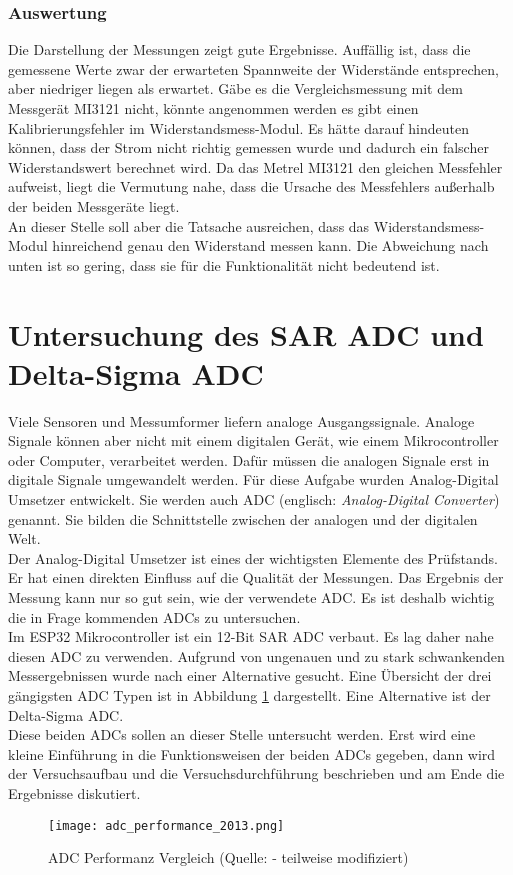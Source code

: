 \subsubsection{Auswertung}
Die Darstellung der Messungen zeigt gute Ergebnisse. Auffällig ist, dass die gemessene Werte zwar der erwarteten Spannweite der Widerstände entsprechen, aber niedriger liegen als erwartet. Gäbe es die Vergleichsmessung mit dem Messgerät MI3121 nicht, könnte angenommen werden es gibt einen Kalibrierungsfehler im Widerstandsmess-Modul. Es hätte darauf hindeuten können, dass der Strom nicht richtig gemessen wurde und dadurch ein falscher Widerstandswert berechnet wird. Da das Metrel MI3121 den gleichen Messfehler aufweist, liegt die Vermutung nahe, dass die Ursache des Messfehlers außerhalb der beiden Messgeräte liegt.
\\
An dieser Stelle soll aber die Tatsache ausreichen, dass das Widerstandsmess-Modul hinreichend genau den Widerstand messen kann. Die Abweichung nach unten ist so gering, dass sie für die Funktionalität nicht bedeutend ist.

\section{Untersuchung des SAR ADC und Delta-Sigma ADC}
Viele Sensoren und Messumformer liefern analoge Ausgangssignale. Analoge Signale können aber nicht mit einem digitalen Gerät, wie einem Mikrocontroller oder Computer, verarbeitet werden. Dafür müssen die analogen Signale erst in digitale Signale umgewandelt werden. Für diese Aufgabe wurden Analog-Digital Umsetzer entwickelt. Sie werden auch ADC (englisch: \textit{Analog-Digital Converter}) genannt. Sie bilden die Schnittstelle zwischen der analogen und der digitalen Welt.
\\
Der Analog-Digital Umsetzer ist eines der wichtigsten Elemente des Prüfstands. Er hat einen direkten Einfluss auf die Qualität der Messungen. Das Ergebnis der Messung kann nur so gut sein, wie der verwendete ADC. Es ist deshalb wichtig die in Frage kommenden ADCs zu untersuchen.
\\
Im ESP32 Mikrocontroller ist ein 12-Bit SAR ADC verbaut. Es lag daher nahe diesen ADC zu verwenden. Aufgrund von ungenauen und zu stark schwankenden Messergebnissen wurde nach einer Alternative gesucht. Eine Übersicht der drei gängigsten ADC Typen ist in Abbildung \ref{adc_vergleich} dargestellt. Eine Alternative ist der Delta-Sigma ADC.
\\
Diese beiden ADCs sollen an dieser Stelle untersucht werden. Erst wird eine kleine Einführung in die Funktionsweisen der beiden ADCs gegeben, dann wird der Versuchsaufbau und die Versuchsdurchführung beschrieben und am Ende die Ergebnisse diskutiert.
\begin{figure}[h!]
\vspace{12pt}
\centering
\texttt{[image: adc\_performance\_2013.png]}
\caption{ADC Performanz Vergleich (Quelle: \cite[][S. 26]{Ohnhaeuser2015} - teilweise modifiziert)}
\label{adc_vergleich}
\vspace{12pt}
\end{figure}

